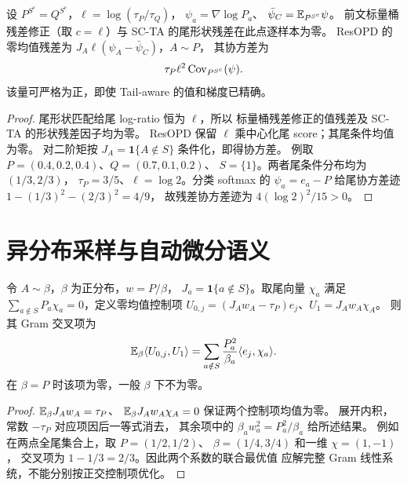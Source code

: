 \begin{proposition}[尾形状匹配时的残差梯度噪声]
\label{prop:tailmatch-noise}
设 $P^{S^c}=Q^{S^c}$，$\ell=\log(\tau_P/\tau_Q)$，
$\psi_a=\nabla\log P_a$、
$\bar\psi_C=\mathbb E_{P^{S^c}}\psi$。
前文标量桶残差修正（取 $c=\ell$）与 SC-TA 的尾形状残差在此点逐样本为零。
ResOPD 的零均值残差为
$J_A\ell(\psi_A-\bar\psi_C)$，$A\sim P$，
其协方差为
\begin{equation}
\tau_P\ell^2\operatorname{Cov}_{P^{S^c}}(\psi).
\end{equation}
该量可严格为正，即使 Tail-aware 的值和梯度已精确。
\end{proposition}
\begin{proof}
尾形状匹配给尾 log-ratio 恒为 $\ell$，所以
标量桶残差修正的值残差及 SC-TA 的形状残差因子均为零。
ResOPD 保留 $\ell$ 乘中心化尾 score；其尾条件均值为零。
对二阶矩按 $J_A=\mathbf1\{A\notin S\}$ 条件化，即得协方差。
例取 $P=(0.4,0.2,0.4)$、$Q=(0.7,0.1,0.2)$、
$S=\{1\}$。两者尾条件分布均为 $(1/3,2/3)$，
$\tau_P=3/5$、$\ell=\log2$。分类 softmax 的
$\psi_a=e_a-P$ 给尾协方差迹 $1-(1/3)^2-(2/3)^2=4/9$，
故残差协方差迹为 $4(\log2)^2/15>0$。
\end{proof}

\section{异分布采样与自动微分语义}
\begin{proposition}[异分布下的双控制项一般耦合]
\label{prop:offpolicy-control}
令 $A\sim\beta$，$\beta$ 为正分布，$w=P/\beta$，
$J_a=\mathbf1\{a\notin S\}$。取尾向量 $\chi_a$ 满足
$\sum_{a\notin S}P_a\chi_a=0$，定义零均值控制项
$U_{0,j}=(J_Aw_A-\tau_P)e_j$、$U_1=J_Aw_A\chi_A$。
则其 Gram 交叉项为
\begin{equation}
\mathbb E_\beta\langle U_{0,j},U_1\rangle
=\sum_{a\notin S}\frac{P_a^2}{\beta_a}\langle e_j,\chi_a\rangle.
\end{equation}
在 $\beta=P$ 时该项为零，一般 $\beta$ 下不为零。
\end{proposition}
\begin{proof}
$\mathbb E_\beta J_Aw_A=\tau_P$、
$\mathbb E_\beta J_Aw_A\chi_A=0$ 保证两个控制项均值为零。
展开内积，常数 $-\tau_P$ 对应项因后一等式消去，
其余项中的 $\beta_aw_a^2=P_a^2/\beta_a$ 给所述结果。
例如在两点全尾集合上，取 $P=(1/2,1/2)$、
$\beta=(1/4,3/4)$ 和一维 $\chi=(1,-1)$，
交叉项为 $1-1/3=2/3$。因此两个系数的联合最优值
应解完整 Gram 线性系统，不能分别按正交控制项优化。
\end{proof}

